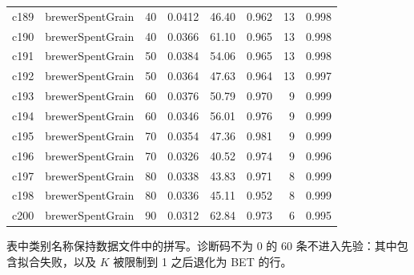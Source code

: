 \begin{longtable}{llrrrrrr}
c189 & brewerSpentGrain & 40 & 0.0412 & 46.40 & 0.962 & 13 & 0.998 \\
c190 & brewerSpentGrain & 40 & 0.0366 & 61.10 & 0.965 & 13 & 0.998 \\
c191 & brewerSpentGrain & 50 & 0.0384 & 54.06 & 0.965 & 13 & 0.998 \\
c192 & brewerSpentGrain & 50 & 0.0364 & 47.63 & 0.964 & 13 & 0.997 \\
c193 & brewerSpentGrain & 60 & 0.0376 & 50.79 & 0.970 & 9 & 0.999 \\
c194 & brewerSpentGrain & 60 & 0.0346 & 56.01 & 0.976 & 9 & 0.999 \\
c195 & brewerSpentGrain & 70 & 0.0354 & 47.36 & 0.981 & 9 & 0.999 \\
c196 & brewerSpentGrain & 70 & 0.0326 & 40.52 & 0.974 & 9 & 0.996 \\
c197 & brewerSpentGrain & 80 & 0.0338 & 43.83 & 0.971 & 8 & 0.999 \\
c198 & brewerSpentGrain & 80 & 0.0336 & 45.11 & 0.952 & 8 & 0.999 \\
c200 & brewerSpentGrain & 90 & 0.0312 & 62.84 & 0.973 & 6 & 0.995 \\
\bottomrule
\end{longtable}
表中类别名称保持数据文件中的拼写。诊断码不为 0 的 60 条不进入先验：其中包含拟合失败，以及 $K$ 被限制到 1 之后退化为 BET 的行。
